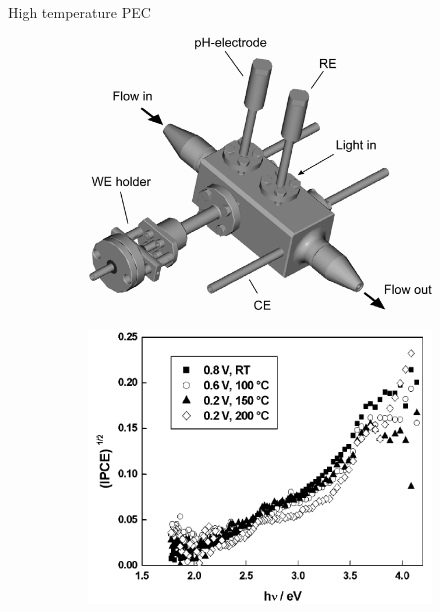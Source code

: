 \documentclass[10pt,compress,handout]{beamer}
\newcommand{\coef}{1}
\begin{document}
\begin{frame}[allowframebreaks=1.0]{High temperature PEC}
        \renewcommand{\coef}{0.45}
        \begin{figure}[h]
            \centering
            \begin{subfigure}{\coef\textwidth}
                \centering
                \includegraphics[width=\textwidth]{./src/figures/Bojinov_2002_Fig1.png}
                \caption{}
                \label{fig_bojinov_ht_a}
            \end{subfigure}
            \begin{subfigure}{\coef\textwidth}
                \centering
                \includegraphics[width=\textwidth]{./src/figures/Bojinov_2002_Fig5b.png}
                \caption{}
                \label{fig_bojinov_ht_b}
            \end{subfigure}
            

\end{figure}
\end{frame}
\end{document}

